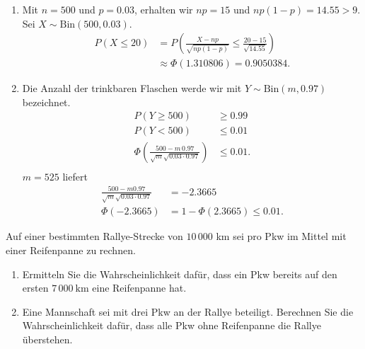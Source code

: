 \solution 
\begin{enumerate}
    \item Mit $n=500$ und $p=0.03$, erhalten wir $np = 15$ und $np(1-p) = 14.55 > 9$.
        Sei $X \sim \text{Bin}(500,0.03)$.
        \begin{align*}
            P\left( X \leq 20 \right) &= 
                P \left( \frac{ X - np}{ \sqrt{np(1-p)} } \leq \frac{20 - 15}{ \sqrt{14.55}} \right) \\
                &\approx \Phi\left( 1.310806 \right) = 0.9050384. 
        \end{align*}

    \item Die Anzahl der trinkbaren Flaschen werde wir mit $Y \sim
        \text{Bin}(m, 0.97)$ bezeichnet. 
        \begin{align*}
            P\left( Y \geq 500 \right) & \geq 0.99 \\
            P\left( Y<500 \right) & \leq 0.01 \\
            \Phi\left( \frac{500 - m\, 0.97}{\sqrt{m}\sqrt{0.03\cdot 0.97}} \right) & \leq 0.01. \\
        \end{align*}
        $m=525$ liefert
        \begin{align*}
            \frac{500 - m 0.97}{\sqrt{m}\sqrt{0.03\cdot 0.97}} &= -2.3665 \\
            \Phi(-2.3665) &= 1 - \Phi( 2.3665 ) \leq 0.01.
        \end{align*}
\end{enumerate}



 Auf einer bestimmten Rallye-Strecke von $10\, 000$ km
sei pro Pkw im Mittel mit einer Reifenpanne zu rechnen. 
\begin{enumerate}
    \item Ermitteln Sie die Wahrscheinlichkeit dafür, dass ein Pkw bereits auf
        den ersten $7\, 000~\text{km}$ eine Reifenpanne hat. 
    \item Eine Mannschaft sei mit drei Pkw an der Rallye beteiligt. Berechnen
        Sie die Wahrscheinlichkeit dafür, dass alle Pkw ohne Reifenpanne die
        Rallye überstehen. 
\end{enumerate}


